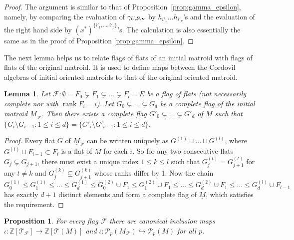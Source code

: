 \documentclass{amsart}
\newtheorem{lemma}[theorem]{Lemma}
\newtheorem{proposition}[theorem]{Proposition}
\newcommand\Bcal{{\mathcal B}}
\newcommand\Fcal{{\mathcal F}}
\newcommand\Pcal{{\mathcal P}}
\newcommand\Tcal{{\mathcal T}}
\newcommand\vv{{\bf v}}
\newcommand\ZZ{{\mathbb Z}}
\DeclareMathOperator{\rank}{rank}
\begin{document}
{\begin{proof}
    The argument is similar to that of Proposition~\ref{prop:gamma_epsilon}, namely, by comparing the evaluation of $\gamma_{U,\Bcal,\vv}$ by $h_{i'_1}\ldots h_{i'_p}$'s and the evaluation of the right hand side by $(x^*)^{\{i'_1,\ldots,i'_p\}}$'s. The calculation is also essentially the same as in the proof of Proposition \ref{prop:gamma_epsilon}. 
\end{proof}

The next lemma helps us to relate flags of flats of an initial matroid with flags of flats of the original matroid. It is used to define maps between the Cordovil algebras of initial oriented matroids to that of the original oriented matroid.

\begin{lemma} \label{lem:IM_flag}
    Let $\Fcal:\emptyset=F_0 \subsetneq  F_1 \subsetneq \ldots \subsetneq F_l=E$ be a flag of flats (not necessarily complete nor with $\rank F_i=i$). Let $G_0 \subsetneq  \ldots \subsetneq  G_d$ be a complete flag of the initial matroid $\underline{M}_\Fcal$. Then there exists a complete flag $G'_0 \subsetneq  \ldots \subsetneq G'_d$ of $\underline{M}$ such that $\{G_i\setminus G_{i-1}: 1\leq i\leq d\}=\{G'_i\setminus G'_{i-1}: 1\leq i\leq d\}$.
\end{lemma}

\begin{proof}
    Every flat $G$ of $\underline{M}_\Fcal$ can be written uniquely as $G^{(1)}\sqcup\ldots\sqcup G^{(l)}$, where $G^{(i)}\sqcup F_{i-1}\subset F_i$ is a flat of $\underline{M}$ for each $i$. So for any two consecutive flats $G_j\subsetneq G_{j+1}$, there must exist a unique index $1\leq k\leq l$ such that $G_j^{(t)}=G_{j+1}^{(t)}$ for any $t\neq k$ and $G_j^{(k)}\subsetneq G_{j+1}^{(k)}$ whose ranks differ by 1. Now the chain $G_0^{(1)}\leq G_1^{(1)}\leq\ldots\leq G_d^{(1)}\leq G_0^{(2)}\cup F_1\leq G_1^{(2)}\cup F_1\leq\ldots\leq G_d^{(2)}\cup F_1\leq \ldots\leq G_d^{(l)}\cup F_{l-1}$ has exactly $d+1$ distinct elements and form a complete flag of $\underline{M}$, which satisfies the requirement.
\end{proof}

 \begin{proposition}\label{prop:tope_filtration_incl}
For every flag $\Fcal$ there are canonical inclusion maps 
$\iota: \ZZ[\Tcal_{\Fcal}] \to  \ZZ[\Tcal(M)]$ and $\iota:\Pcal_p(M_\Fcal)\hookrightarrow \Pcal_p(M)$ for all $p$.
 \end{proposition}

}
\end{document}
